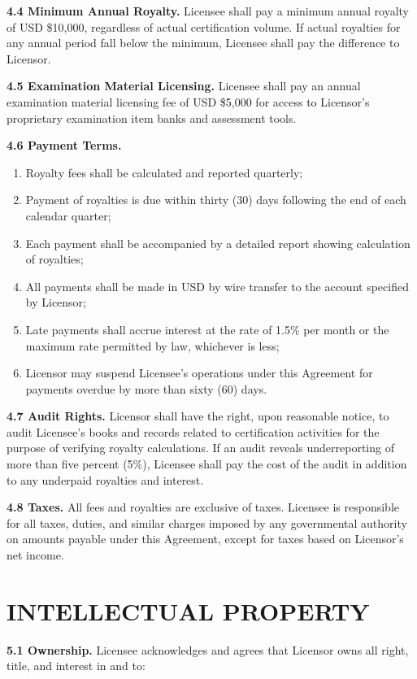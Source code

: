 \documentclass[11pt,a4paper]{article}
\begin{document}
\textbf{4.4 Minimum Annual Royalty.} Licensee shall pay a minimum annual royalty of USD \$10,000, regardless of actual certification volume. If actual royalties for any annual period fall below the minimum, Licensee shall pay the difference to Licensor.

\textbf{4.5 Examination Material Licensing.} Licensee shall pay an annual examination material licensing fee of USD \$5,000 for access to Licensor's proprietary examination item banks and assessment tools.

\textbf{4.6 Payment Terms.}

\begin{enumerate}[label=\alph*)]
\item Royalty fees shall be calculated and reported quarterly;
\item Payment of royalties is due within thirty (30) days following the end of each calendar quarter;
\item Each payment shall be accompanied by a detailed report showing calculation of royalties;
\item All payments shall be made in USD by wire transfer to the account specified by Licensor;
\item Late payments shall accrue interest at the rate of 1.5\% per month or the maximum rate permitted by law, whichever is less;
\item Licensor may suspend Licensee's operations under this Agreement for payments overdue by more than sixty (60) days.
\end{enumerate}

\textbf{4.7 Audit Rights.} Licensor shall have the right, upon reasonable notice, to audit Licensee's books and records related to certification activities for the purpose of verifying royalty calculations. If an audit reveals underreporting of more than five percent (5\%), Licensee shall pay the cost of the audit in addition to any underpaid royalties and interest.

\textbf{4.8 Taxes.} All fees and royalties are exclusive of taxes. Licensee is responsible for all taxes, duties, and similar charges imposed by any governmental authority on amounts payable under this Agreement, except for taxes based on Licensor's net income.

\section{INTELLECTUAL PROPERTY}

\textbf{5.1 Ownership.} Licensee acknowledges and agrees that Licensor owns all right, title, and interest in and to:
\end{document}
